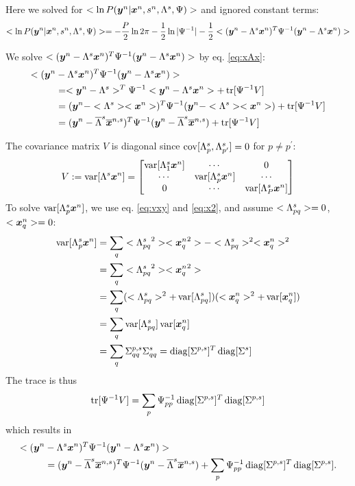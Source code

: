 \documentclass[a4paper]{article}
\begin{document}
Here we solved for $<\ln P(\Xy|\Xx,\Xs,\Xl,\Psi)>$ and ignored constant terms:
\begin{align}
<\ln P(\Xy|\Xx,\Xs,\Xl,\Psi)>=-\frac{P}{2}\ln 2\pi-\frac{1}{2}\ln|\Xpsii|-\frac{1}{2}<(\Xy-\Xl\Xx)^T\Xpsii(\Xy-\Xl\Xx)>
\end{align}

We solve $<(\Xy-\Xl\Xx)^T\Xpsii(\Xy-\Xl\Xx)>$ by eq. \ref{eq:xAx}:
\begin{align}
  <(\Xy&-\Xl\Xx)^T\Xpsii(\Xy-\Xl\Xx)> \\
  &=<\Xy-\Xl>^T\Xpsii<\Xy-\Xl\Xx>+\Xtr[\Xpsii V] \\
  &=(\Xy-<\Xl><\Xx>)^T\Xpsii(\Xy-<\Xl><\Xx>)+\Xtr[\Xpsii V] \\
  &=(\Xy-\Xlm\Xxm)^T\Xpsii(\Xy-\Xlm\Xxm)+\Xtr[\Xpsii V]
\end{align}

The covariance matrix $V$ is diagonal since $\Xcov[\Xl_p,\Xl_{p^\prime}]=0$ for $p\ne p^\prime$:
\begin{align}
  V:=\Xvar[\Xl\Xx]=
  \begin{bmatrix}
  \Xvar[\Xl_1\Xx] & \cdots & 0 \\
  \cdots & \Xvar[\Xl_p\Xx] & \cdots \\
  0   & \cdots & \Xvar[\Xl_P\Xx]
  \end{bmatrix}
\end{align}
To solve $\Xvar[\Xl_p\Xx]$, we use eq. \ref{eq:vxy} and \ref{eq:x2}, and assume $<\Xl_{pq}>=0$, $<\Xx_q>=0$:
\begin{align}
  \Xvar[\Xl_p\Xx]
  &=\sum_q<{\Xl_{pq}}^2><{\Xx_q}^2>-<{\Xl_{pq}}>^2<{\Xx_q}>^2 \\
  &=\sum_q<{\Xl_{pq}}^2><{\Xx_q}^2> \\
  &=\sum_q (<{\Xl_{pq}}>^2+\Xvar[\Xl_{pq}])(<{\Xx_{q}}>^2+\Xvar[{\Xx_{q}}]) \\
  &=\sum_q \Xvar[\Xl_{pq}]\Xvar[{\Xx_{q}}] \\
  &=\sum_q \Xls_{qq}\Xxs_{qq}=\Xdiag[\Xls]^T\Xdiag[\Xxs]
\end{align}
The trace is thus
\begin{align}
  \Xtr[\Xpsii V]=\sum_p \Xpsii_{pp}\Xdiag[\Xls]^T\Xdiag[\Xls]
\end{align}
which results in
\begin{align}
  <(\Xy&-\Xl\Xx)^T\Xpsii(\Xy-\Xl\Xx)> \\
  &=(\Xy-\Xlm\Xxm)^T\Xpsii(\Xy-\Xlm\Xxm)+\sum_p \Xpsii_{pp}\Xdiag[\Xls]^T\Xdiag[\Xls].
\end{align}
\end{document}

